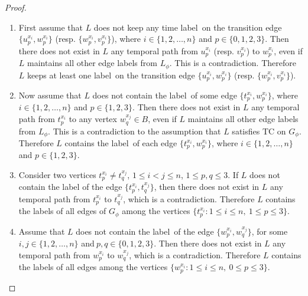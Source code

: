 \documentclass[a4paper,UKenglish]{article}
\begin{document}
\begin{proof}
\begin{enumerate}[label=(\alph*)]
\item First assume that $L $ does not keep any time label~on
the transition edge $ \{ u_{p}^{x_{i}}  ,  w_{p}^{x_{i}}  \}$ (resp. $\{ w_{p}^{x_{i}} , v_{p}^{x_{i}}  \}  $), where $i\in \{1,2,\ldots ,n\}$ and $p\in
\{0,1,2,3\}$. Then there does not exist in $L $ any temporal path from 
$u_{p}^{x_{i}}$ (resp. $v_{p}^{x_{i}}$) to $w_{p}^{x_{i}}$, even if $L 
$ maintains all other edge labels from $L _{\phi }$. This is a
contradiction. Therefore $L $ keeps at least one label~on the
transition edge $ \{  u_{p}^{x_{i}} , w_{p}^{x_{i}}  \}$ (resp. $\{ w_{p}^{x_{i}} , v_{p}^{x_{i}}  \}  $).

\item Now assume that $L $ does not contain the label~of some
edge $ \{ t_{p}^{x_{i}}  ,  w_{p}^{x_{i}}  \}  $, where $i\in \{1,2,\ldots ,n\}$ and $p\in
\{1,2,3\}$. Then there does not exist in $L $ any temporal path from $t_{p}^{x_{i}}$ to any vertex $w_{q}^{x_{j}}\in B$, even if $L $
maintains all other edge labels from $L _{\phi }$. This is a
contradiction to the assumption that $L $ satisfies TC on $G_{\phi }$. Therefore $L $ contains the label~of each edge $\{  t_{p}^{x_{i}} , w_{p}^{x_{i}}  \}  $, where $i\in \{1,2,\ldots ,n\}$ and $p\in
\{1,2,3\}$.

\item Consider two vertices $t_{p}^{x_{i}}\neq t_{q}^{x_{j}}$, $1\leq i<j\leq n$, $1\leq p,q\leq 3$. If $L $ does not contain the label
of the edge $ \{  t_{p}^{x_{i}}  ,  t_{q}^{x_{j}}  \}  $, then there does not exist in $L $ any temporal path from $t_{p}^{x_{i}}$ to $t_{q}^{x_{j}}$, which is a
contradiction. Therefore $L $ contains the labels of all edges of $G_{\phi }$ among the vertices $\{t_{p}^{x_{i}}:1\leq i\leq n,\ 1\leq p\leq
3\}$.

\item Assume that $L $ does not contain the label~of the edge $\{  w_{p}^{x_{i}} , w_{q}^{x_{j}}  \}  $, for some $i,j\in \{1,2,\ldots ,n\}$ and$\
p,q\in \{0,1,2,3\}$. Then there does not exist in $L $ any temporal
path from $w_{p}^{x_{i}}$ to $w_{q}^{x_{j}}$, which is a contradiction.
Therefore $L $ contains the labels of all edges among the vertices $\{w_{p}^{x_{i}}:1\leq i\leq n,\ 0\leq p\leq 3\}$.


\end{enumerate}
\end{proof}
\end{document}

